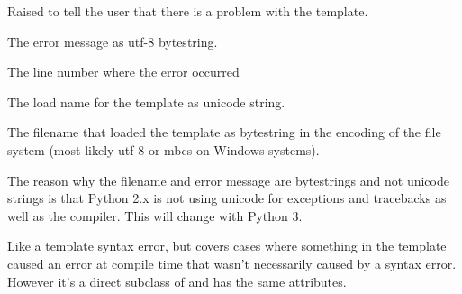 \documentclass[a4paper,10pt,english]{sphinxmanual}
\begin{document}
\begin{fulllineitems}
\label{api:jinja2.TemplateSyntaxError}
Raised to tell the user that there is a problem with the template.

\begin{fulllineitems}
\label{api:jinja2.TemplateSyntaxError.message}
The error message as utf-8 bytestring.

\end{fulllineitems}


\begin{fulllineitems}
\label{api:jinja2.TemplateSyntaxError.lineno}
The line number where the error occurred

\end{fulllineitems}


\begin{fulllineitems}
\label{api:jinja2.TemplateSyntaxError.name}
The load name for the template as unicode string.

\end{fulllineitems}


\begin{fulllineitems}
\label{api:jinja2.TemplateSyntaxError.filename}
The filename that loaded the template as bytestring in the encoding
of the file system (most likely utf-8 or mbcs on Windows systems).

\end{fulllineitems}


The reason why the filename and error message are bytestrings and not
unicode strings is that Python 2.x is not using unicode for exceptions
and tracebacks as well as the compiler.  This will change with Python 3.

\end{fulllineitems}


\begin{fulllineitems}
\label{api:jinja2.TemplateAssertionError}
Like a template syntax error, but covers cases where something in the
template caused an error at compile time that wasn't necessarily caused
by a syntax error.  However it's a direct subclass of
{\hyperref[api:jinja2.TemplateSyntaxError]{}} and has the same attributes.

\end{fulllineitems}
\end{document}
